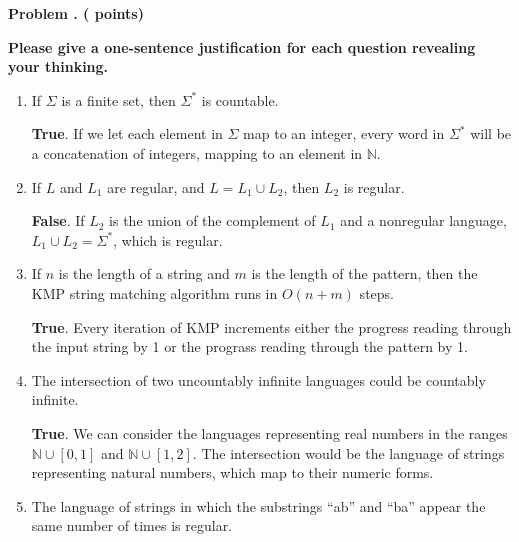 




\newpage
\addtocounter{problemctr}{1}
\noindent
{\bf
Problem \theproblemctr.  (\thetruefalse \xspace points)}
\swallow{ (\thetruefalsetime\xspace minutes)}
\smallskip

\noindent
\textbf{Please give a one-sentence justification for each question
	revealing your thinking.}
\\



\newcommand{\tfspacing}{\vspace{2cm}}

\begin{enumerate}[label=(\alph*) {\bf ~~~T~~~~F~~~~ },leftmargin=*]









\item If $\Sigma$ is a finite set, then $\Sigma^*$ is countable.

\textbf{True}. If we let each element in $\Sigma$ map to an integer, every word in $\Sigma^*$ will be a concatenation of integers, mapping to an element in $\mathbb{N}$.
\tfspacing

\item If $L$ and $L_1$ are regular, and $L = L_1 \cup L_2$, then $L_2$ is regular.

\textbf{False}. If $L_2$ is the union of the complement of $L_1$ and a nonregular language, $L_1\cup L_2=\Sigma^*$, which is regular.
\tfspacing

\item If $n$ is the length of a string and $m$ is the length of the pattern, then the KMP string matching algorithm runs in $O(n+m)$ steps.

\textbf{True}. Every iteration of KMP increments either the progress reading through the input string by 1 or the prograss reading through the pattern by 1.
\tfspacing

\item The intersection of two uncountably infinite languages could be countably infinite.

\textbf{True}. We can consider the languages representing real numbers in the ranges $\mathbb{N}\cup[0,1]$ and $\mathbb{N}\cup[1,2]$. The intersection would be the language of strings representing natural numbers, which map to their numeric forms.
\tfspacing

\item The language of strings in which the substrings ``ab'' and ``ba'' appear the same
number of times is regular.


\end{enumerate}
